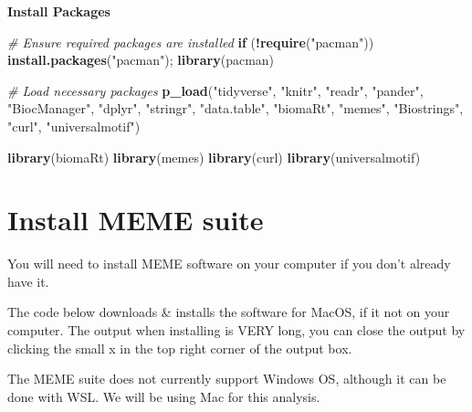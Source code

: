 \documentclass[
]{book}
\newenvironment{Shaded}{\begin{snugshade}}{\end{snugshade}}
\newcommand{\CommentTok}[1]{\textcolor[rgb]{0.56,0.35,0.01}{\textit{#1}}}
\newcommand{\ControlFlowTok}[1]{\textcolor[rgb]{0.13,0.29,0.53}{\textbf{#1}}}
\newcommand{\FunctionTok}[1]{\textcolor[rgb]{0.13,0.29,0.53}{\textbf{#1}}}
\newcommand{\NormalTok}[1]{#1}
\newcommand{\SpecialCharTok}[1]{\textcolor[rgb]{0.81,0.36,0.00}{\textbf{#1}}}
\newcommand{\StringTok}[1]{\textcolor[rgb]{0.31,0.60,0.02}{#1}}
\begin{document}
\textbf{Install Packages}

\begin{Shaded}
\begin{Highlighting}[]
\CommentTok{\# Ensure required packages are installed}
\ControlFlowTok{if}\NormalTok{ (}\SpecialCharTok{!}\FunctionTok{require}\NormalTok{(}\StringTok{"pacman"}\NormalTok{)) }\FunctionTok{install.packages}\NormalTok{(}\StringTok{"pacman"}\NormalTok{); }\FunctionTok{library}\NormalTok{(pacman)}

\CommentTok{\# Load necessary packages}
\FunctionTok{p\_load}\NormalTok{(}\StringTok{"tidyverse"}\NormalTok{, }\StringTok{"knitr"}\NormalTok{, }\StringTok{"readr"}\NormalTok{, }\StringTok{"pander"}\NormalTok{, }\StringTok{"BiocManager"}\NormalTok{, }
       \StringTok{"dplyr"}\NormalTok{, }\StringTok{"stringr"}\NormalTok{, }\StringTok{"data.table"}\NormalTok{,}
       \StringTok{"biomaRt"}\NormalTok{, }\StringTok{"memes"}\NormalTok{, }\StringTok{"Biostrings"}\NormalTok{, }\StringTok{"curl"}\NormalTok{, }\StringTok{"universalmotif"}\NormalTok{)}

\FunctionTok{library}\NormalTok{(biomaRt)}
\FunctionTok{library}\NormalTok{(memes)}
\FunctionTok{library}\NormalTok{(curl)}
\FunctionTok{library}\NormalTok{(universalmotif)}
\end{Highlighting}
\end{Shaded}

\hypertarget{install-meme-suite}{%
\section{Install MEME suite}\label{install-meme-suite}}

You will need to install MEME software on your computer if you don't
already have it.

The code below downloads \& installs the software for MacOS, if it not on
your computer. The output when installing is VERY long, you can close
the output by clicking the small x in the top right corner of the output
box.

The MEME suite does not currently support Windows OS, although it can be
done with WSL. We will be using Mac for this analysis.
\end{document}
